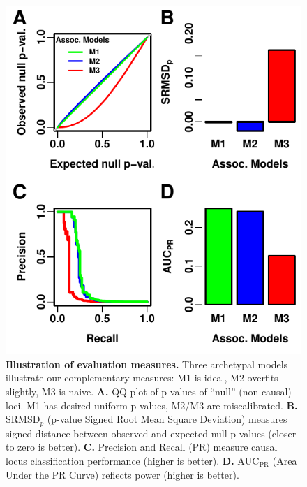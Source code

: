 \documentclass[11pt]{article}
\newcommand{\rmsd}{\text{SRMSD}_p}
\newcommand{\auc}{\text{AUC}_\text{PR}}
\begin{document}
\begin{linenumbers}
\begin{figure}[hp]
  \centering
  \includegraphics{sim-n1000-k10-f0.1-s0.5-g1/measures-illustration.pdf}
  \caption{
    {\bf Illustration of evaluation measures.}
    Three archetypal models illustrate our complementary measures:
    M1 is ideal, M2 overfits slightly, M3 is naive.
    \textbf{A.}
    QQ plot of p-values of ``null'' (non-causal) loci.
    M1 has desired uniform p-values, M2/M3 are miscalibrated.
    \textbf{B.}
    $\rmsd$ (p-value Signed Root Mean Square Deviation) measures signed distance between observed and expected null p-values (closer to zero is better).
    \textbf{C.}
    Precision and Recall (PR) measure causal locus classification performance (higher is better).
    \textbf{D.}
    $\auc$ (Area Under the PR Curve) reflects power (higher is better).
  }
  \label{fig:measures_illustration}
\end{figure}


\end{linenumbers}
\end{document}
